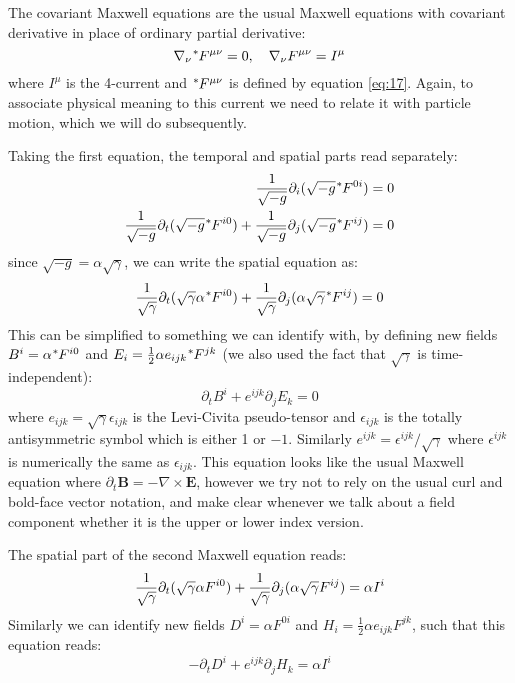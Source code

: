 The covariant Maxwell equations are the usual Maxwell equations with covariant
derivative in place of ordinary partial derivative:
\begin{equation}
  \label{eq:7}
  \nabla_{\nu}\tensor[^{*}]{F}{^{\mu\nu}} = 0, \quad \nabla_{\nu}F^{\mu\nu} = I^{\mu}
\end{equation}
where $I^{\mu}$ is the 4-current and $\tensor[^{*}]{F}{^{\mu\nu}}$ is defined by
equation \eqref{eq:17}. Again, to associate physical meaning to this
current we need to relate it with particle motion, which we will do
subsequently.

Taking the first equation, the temporal and spatial parts read separately:
\begin{align}
  \frac{1}{\sqrt{-g}}\partial_i(\sqrt{-g}\tensor[^{*}]{F}{^{0i}}) &= 0 \\
  \frac{1}{\sqrt{-g}}\partial_t(\sqrt{-g}\tensor[^{*}]{F}{^{i0}}) + \frac{1}{\sqrt{-g}}\partial_j(\sqrt{-g}\tensor[^{*}]{F}{^{ij}}) &= 0
\end{align}
since $\sqrt{-g} = \alpha\sqrt{\gamma}$, we can write the spatial equation as:
\begin{equation}
  \label{eq:10}
  \frac{1}{\sqrt{\gamma}}\partial_t(\sqrt{\gamma}\alpha\tensor[^{*}]{F}{^{i0}}) + \frac{1}{\sqrt{\gamma}}\partial_j(\alpha\sqrt{\gamma}\tensor[^{*}]{F}{^{ij}}) = 0
\end{equation}
This can be simplified to something we can identify with, by defining new fields
$B^i = \alpha\tensor[^{*}]{F}{^{i0}}$ and $E_i = \frac{1}{2}\alpha
e_{ijk}\tensor[^{*}]{F}{^{jk}}$ (we also used the fact that $\sqrt{\gamma}$ is time-independent):
\begin{equation}
  \label{eq:11}
  \partial_tB^i + e^{ijk}\partial_jE_k = 0
\end{equation}
where $e_{ijk} = \sqrt{\gamma}\epsilon_{ijk}$ is the Levi-Civita pseudo-tensor
and $\epsilon_{ijk}$ is the totally antisymmetric symbol which is either 1 or
$-1$. Similarly $e^{ijk} = \epsilon^{ijk}/\sqrt{\gamma}$ where $\epsilon^{ijk}$
is numerically the same as $\epsilon_{ijk}$. This equation looks like the usual
Maxwell equation where $\partial_t\mathbf{B} = -\nabla\times \mathbf{E}$,
however we try not to rely on the usual curl and bold-face vector notation, and
make clear whenever we talk about a field component whether it is the upper or
lower index version.

The spatial part of the second Maxwell equation reads:
\begin{equation}
  \label{eq:14}
  \frac{1}{\sqrt{\gamma}}\partial_t(\sqrt{\gamma}\alpha\tensor{F}{^{i0}}) + \frac{1}{\sqrt{\gamma}}\partial_j(\alpha\sqrt{\gamma}\tensor{F}{^{ij}}) = \alpha I^{i}
\end{equation}
Similarly we can identify new fields $D^i = \alpha F^{0i}$ and $H_i =
\frac{1}{2}\alpha e_{ijk}F^{jk}$, such that this equation reads:
\begin{equation}
  \label{eq:15}
  -\partial_tD^i + e^{ijk}\partial_jH_k = \alpha I^i
\end{equation}

